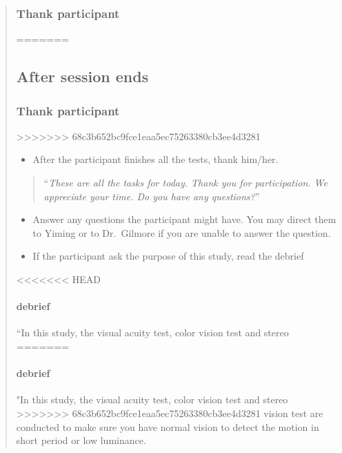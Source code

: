 \documentclass[]{article}
\providecommand{\tightlist}{%
  \setlength{\itemsep}{0pt}\setlength{\parskip}{0pt}}
\let\oldparagraph\paragraph
\renewcommand{\paragraph}[1]{\oldparagraph{#1}\mbox{}}
\begin{document}
\begin{quote}
\subsubsection{Thank participant}\label{thank-participant}
=======
\hypertarget{after-session-ends}{%
\subsection{After session ends}\label{after-session-ends}}

\hypertarget{thank-participant}{%
\subsubsection{Thank participant}\label{thank-participant}}
>>>>>>> 68c3b652bc9fce1eaa5ec75263380cb3ee4d3281

\begin{itemize}
\tightlist
\item
  After the participant finishes all the tests, thank him/her.
\end{itemize}

\begin{quote}
``\emph{These are all the tasks for today. Thank you for participation.
We appreciate your time. Do you have any questions?}''
\end{quote}

\begin{itemize}
\tightlist
\item
  Answer any questions the participant might have. You may direct them
  to Yiming or to Dr.~Gilmore if you are unable to answer the question.
\item
  If the participant ask the purpose of this study, read the debrief
\end{itemize}

<<<<<<< HEAD
\paragraph{debrief}\label{debrief}

``In this study, the visual acuity test, color vision test and stereo
=======
\hypertarget{debrief}{%
\paragraph{debrief}\label{debrief}}

"In this study, the visual acuity test, color vision test and stereo
>>>>>>> 68c3b652bc9fce1eaa5ec75263380cb3ee4d3281
vision test are conducted to make sure you have normal vision to detect
the motion in short period or low luminance.


\end{quote}
\end{document}
